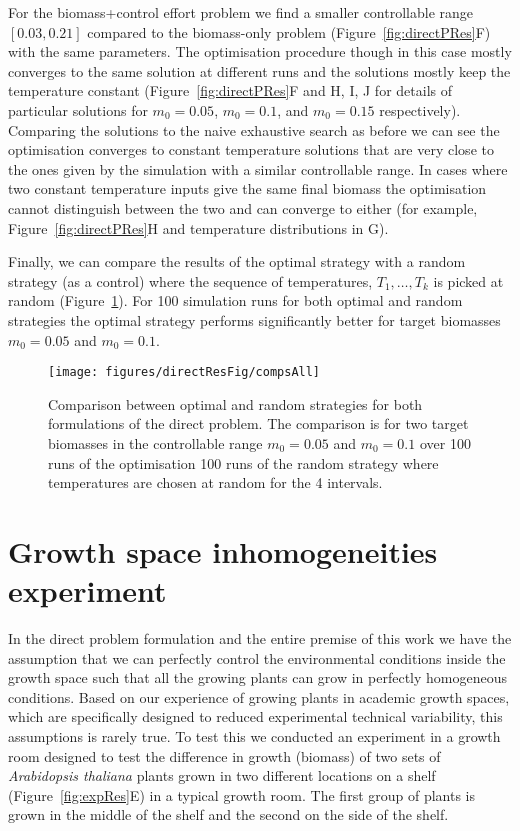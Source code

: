 For the biomass+control effort problem we find a smaller controllable range
$[0.03, 0.21]$ compared to the biomass-only problem
(Figure~\ref{fig:directPRes}F) with the same parameters. The optimisation
procedure though in this case mostly converges to the same solution at different
runs and the solutions mostly keep the temperature constant
(Figure~\ref{fig:directPRes}F and H, I, J for details of particular solutions
for $m_0=0.05$, $m_0=0.1$, and $m_0=0.15$ respectively). Comparing the solutions
to the naive exhaustive search as before we can see the optimisation converges
to constant temperature solutions that are very close to the ones given by the
simulation with a similar controllable range. In cases where two constant
temperature inputs give the same final biomass the optimisation cannot
distinguish between the two and can converge to either (for example,
Figure~\ref{fig:directPRes}H and temperature distributions in G).

Finally, we can compare the results of the optimal strategy with a random
strategy (as a control) where the sequence of temperatures, $T_1, \dots, T_k$ is
picked at random (Figure~\ref{fig:compsAllDir}). For 100 simulation runs for
both optimal and random strategies the optimal strategy performs significantly
better for target biomasses $m_0=0.05$ and $m_0=0.1$.

\begin{figure}
\centering
\texttt{[image: figures/directResFig/compsAll]}
\caption{
  Comparison between optimal and random strategies for both formulations of the
  direct problem. The comparison is for two target biomasses in the controllable
  range $m_0=0.05$ and $m_0=0.1$ over 100 runs of the optimisation 100 runs of
  the random strategy where temperatures are chosen at random for the 4
  intervals.
}
\label{fig:compsAllDir}
\end{figure}


\section{Growth space inhomogeneities experiment}
\label{sec:exp}
In the direct problem formulation and the entire premise of this work we have
the assumption that we can perfectly control the environmental conditions inside
the growth space such that all the growing plants can grow in perfectly
homogeneous conditions. Based on our experience of growing plants in academic
growth spaces, which are specifically designed to reduced experimental technical
variability, this assumptions is rarely true. To test this we conducted an
experiment in a growth room designed to test the difference in growth (biomass)
of two sets of \textit{Arabidopsis thaliana} plants grown in two different
locations on a shelf (Figure~\ref{fig:expRes}E) in a typical growth room. The
first group of plants is grown in the middle of the shelf and the second on the
side of the shelf.

